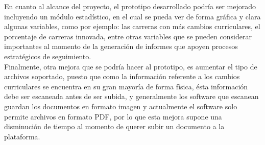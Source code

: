 	
	En cuanto al alcance del proyecto, el prototipo desarrollado podría ser mejorado incluyendo un módulo estadístico, en el cual se pueda ver de forma gráfica y clara algunas variables, como por ejemplo: las carreras con más cambios curriculares, el porcentaje de carreras innovada, entre otras variables que se pueden considerar importantes al momento de la generación de informes que apoyen procesos estratégicos de seguimiento.
	\\
	
	Finalmente, otra mejora que se podría hacer al prototipo, es aumentar el tipo de archivos soportado, puesto que como la información referente a los cambios curriculares se encuentra en su gran mayoría de forma física, ésta información debe ser escaneada antes de ser subida, y generalmente los software que escanean guardan los documentos en formato imagen y actualmente el software solo permite archivos en formato PDF, por lo que esta mejora supone una disminución de tiempo al momento de querer subir un documento a la plataforma.